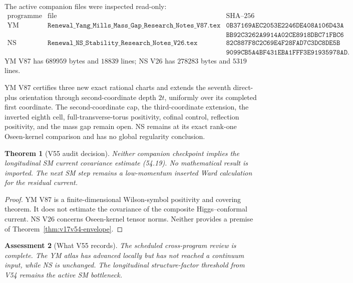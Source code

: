 \documentclass[11pt]{article}
\newtheorem{theorem}{Theorem}[section]
\newtheorem{assessment}[theorem]{Assessment}
\theoremstyle{remark}
\begin{document}
The active companion files were inspected read-only:
\[
\begin{array}{lll}
\text{programme}&\text{file}&\text{SHA--256}\\
\text{YM}&
\texttt{Renewal\_Yang\_Mills\_Mass\_Gap\_Research\_Notes\_V87.tex}&
\texttt{0B37169AEC2053E2246DE408A106D43A}\\
&&\texttt{BB92C3262A9914A02CE8918DBC71FBC6}\\
\text{NS}&
\texttt{Renewal\_NS\_Stability\_Research\_Notes\_V26.tex}&
\texttt{82C887F8C2C69E4F28FAD7C3DC8DE5B}\\
&&\texttt{9099CB5A4BF431EBA1FFF3E91935978AD}.
\end{array}                                        \tag{55.1}
\]
YM V87 has \(689959\) bytes and \(18839\) lines; NS V26 has
\(278283\) bytes and \(5319\) lines.

YM V87 certifies three new exact rational charts and extends the
seventh direct-plus orientation through second-coordinate depth
\(2t\), uniformly over its completed first coordinate.  The
second-coordinate cap, the third-coordinate extension, the inverted
eighth cell, full-transverse-torus positivity, cofinal control,
reflection positivity, and the mass gap remain open.  NS remains at
its exact rank-one Oseen-kernel comparison and has no global
regularity conclusion.

\begin{theorem}[V55 audit decision]
\label{thm:v17v55-decision}
Neither companion checkpoint implies the longitudinal SM current
covariance estimate (54.19).  No mathematical result is imported.
The next SM step remains a low-momentum inserted Ward calculation for
the residual current.
\end{theorem}

\begin{proof}
YM V87 is a finite-dimensional Wilson-symbol positivity and covering
theorem.  It does not estimate the covariance of the composite
Higgs--conformal current.  NS V26 concerns Oseen-kernel tensor norms.
Neither provides a premise of Theorem~\ref{thm:v17v54-envelope}.
\end{proof}

\begin{assessment}[What V55 records]
\label{ass:v17v55-status}
The scheduled cross-program review is complete.  The YM atlas has
advanced locally but has not reached a continuum input, while NS is
unchanged.  The longitudinal structure-factor threshold from V54
remains the active SM bottleneck.
\end{assessment}
\end{document}
